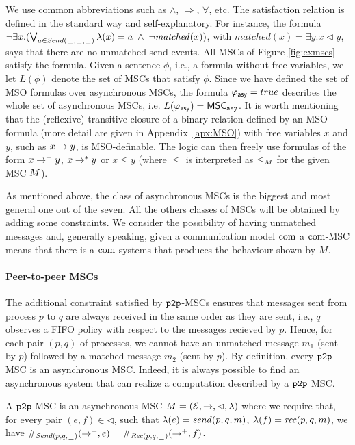 We use common abbreviations such as $\wedge$, $\Rightarrow$, $\forall$, etc. The satisfaction relation is defined in the standard way and self-explanatory.
For instance, the formula $\neg\exists x.(\bigvee_{a \in \sAct} \lambda(x) = a \;\wedge\; \neg \mathit{matched}(x))$, 
with $\mathit{matched}(x) = \exists y.x \lhd y$, 
says that there are no unmatched send events. All MSCs of Figure \ref{fig:exmscs} satisfy the formula. Given a sentence $\phi$, i.e., a formula without free variables,
we let $L(\phi)$ denote the set of MSCs that satisfy $\phi$. Since we have defined the set of MSO formulas over asynchronous MSCs, the formula $\asformula = true$ describes the whole set of asynchronous MSCs, i.e. $L(\asformula) = \asMSCs$. It is worth mentioning that the (reflexive) transitive closure of a binary relation defined by an MSO formula (more detail are given in Appendix~\ref{apx:MSO}) with free variables $x$ and $y$, such as $x \procrel y$, is MSO-definable. The logic can then freely use formulas of the form $x \procrel^+ y$, $x \procrel^* y$ or $x \le y$ (where $\le$ is interpreted as $\le_\msc$ for the given MSC $\msc$).

As mentioned above, the class of asynchronous MSCs is the biggest and most general one out of the seven. All the others classes of MSCs will be obtained by adding some constraints. We consider the possibility of having unmatched messages and, generally speaking, given a communication model $\comsymb$ a $\comsymb$-MSC means that there is a $\comsymb$-systems that produces the behaviour shown by $M$.


\paragraph{\bf Peer-to-peer MSCs}
The additional constraint satisfied by $\oneone$-MSCs ensures that messages sent from  process $p$ to  $q$ are always received in the same order as they are sent, i.e., $q$ observes a FIFO policy with respect to the messages recieved by $p$.  Hence, for each pair $(p,q)$ of processes, we cannot have an unmatched message $m_1$ (sent by $p$) followed by a matched message $m_2$ (sent by $p$).  By definition, every $\oneone$-MSC is an asynchronous MSC. Indeed, it is always possible to find an asynchronous system that can realize a computation described by a $\oneone$ MSC. 
\begin{definition}
A $\oneone$-MSC is an asynchronous MSC $\msc = (\Events,\procrel,\lhd,\lambda)$ where we require that, for every pair $(e,f) \in {\lhd}$, such that $\lambda(e) = \sact{p}{q}{\msg}$, $\lambda(f) = \ract{p}{q}{\msg}$, we have $\sametype{e}{\pqsAct{p}{q}}{\procrel^+} = \sametype{f}{\pqrAct{p}{q}}{\procrel^+}$.
\end{definition}

